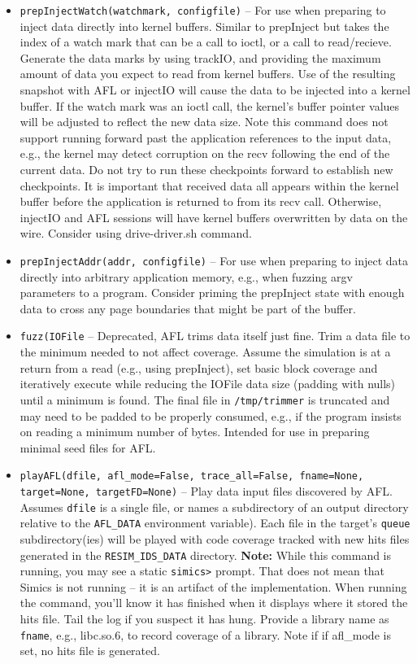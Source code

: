 \documentclass[titlepage]{article}
\begin{document}
\begin{itemize}
\item{\tt prepInjectWatch(watchmark, configfile)} -- For use when preparing to inject data directly into kernel buffers.  
Similar to prepInject but takes the index of a watch 
mark that can be a call to ioctl, or a call to read/recieve. Generate the data marks by using trackIO, and providing the maximum amount of data you expect to 
read from kernel buffers.
Use of the resulting snapshot with AFL or injectIO will cause the data to be injected
into a kernel buffer. If the watch mark was an ioctl call, the kernel's buffer pointer values will be adjusted to reflect the new data size.  Note this command does not support running forward past the application
references to the input data, e.g., the kernel may detect corruption on the recv following the end of the current data.
Do not try to run these checkpoints forward to establish new checkpoints.
It is important that received data all appears within the kernel buffer before the application is returned to from its recv call.  Otherwise, injectIO and AFL sessions
will have kernel buffers overwritten by data on the wire.  Consider using drive-driver.sh command.

\item{\tt prepInjectAddr(addr, configfile)} -- For use when preparing to inject data directly into arbitrary application memory, e.g., when fuzzing argv parameters
to a program.  Consider priming the prepInject state with enough data to cross any page boundaries that might be part of the buffer.

\item{\tt fuzz(IOFile} -- Deprecated, AFL trims data itself just fine.  Trim a data file to the minimum needed to not affect coverage. Assume the simulation is at 
a return from a read (e.g., using prepInject), set basic block coverage and iteratively execute while reducing the
IOFile data size (padding with nulls) until a minimum is found.  The final file in {\tt /tmp/trimmer} is truncated and may need to be padded to be properly consumed, e.g.,
if the program insists on reading a minimum number of bytes.  Intended for use in preparing minimal seed files for AFL.

\item{\tt playAFL(dfile, afl\_mode=False, trace\_all=False, fname=None, target=None, targetFD=None)} -- Play data input files discovered by AFL.  Assumes {\tt dfile} is a single file, or names a subdirectory of an output directory relative to the {\tt AFL\_DATA} environment variable).  
Each file in the target's {\tt queue} subdirectory(ies) will be played with code coverage tracked with new hits files generated in the {\tt RESIM\_IDS\_DATA} directory.
\textbf{Note:} While this command is running, you may see a static {\tt simics>} prompt.  That does not mean that Simics is not running -- it is an artifact of the implementation.  When running the command, you'll know it has finished when it displays where it stored the hits file.
Tail the log if you suspect it has hung.  Provide a library name as {\tt fname}, e.g., libc.so.6, to record coverage of a library.  Note if if afl\_mode is set, no hits file is generated.


\end{itemize}
\end{document}
